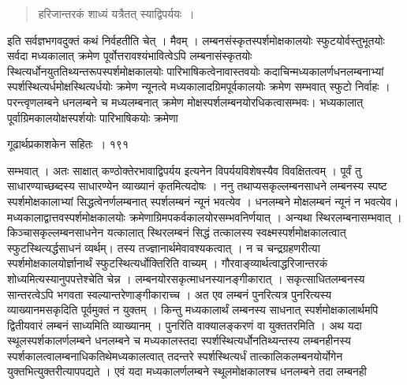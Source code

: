 \documentclass[11pt, openany]{book}
\begin{document}
\begin{quote}
{\qt हरिजान्तरकं शाध्यं यत्रैतत् स्याद्विपर्ययः~।}
\end{quote}

\begin{sloppypar}
इति सर्वज्ञभगवदुक्तं कथं निर्वहतीति चेत् । मैवम् । लम्बनसंस्कृतस्पर्शमोक्षकालयोः स्फुटयोर्वस्तुभूतयोः सर्वदा मध्यकालात् क्रमेण पूर्वोत्तरावश्यंभावित्वेऽपि लम्बनासंस्कृतयोः स्थित्यर्धोनयुततिथ्यन्तरूपस्पर्शमोक्षकालयोः पारिभाषिकत्वेनावास्तवयोः कदाचिन्मध्यकालर्णधनलम्बनाभ्यां स्पर्शस्थित्यर्धमोक्षस्थित्यर्धयोः क्रमेण न्यूनत्वे मध्यकालादग्रिमपूर्वकालयोः क्रमेण सम्भवात् स्फुटो निर्वाहः । परन्त्वृणलम्बने धनलम्बने च मध्यलम्बनात् क्रमेण मोक्षस्पर्शलम्बनयोरधिकत्वासम्भवः। भध्यकालात् पूर्वाग्रिमकालयोक्षस्पर्शयोः पारिभाषिकयोः क्रमेणा\textendash
\end{sloppypar}

\newpage

\hspace{3cm} गूढार्थप्रकाशकेन सहितः~। \hfill १९१
\vspace{1cm}

\begin{sloppypar}
\noindent सम्भवात् । अतः साक्षात् कण्ठोक्तेरभावाद्विपर्यय इत्यनेन विपर्ययविशेषस्यैव विवक्षितत्वम् । पूर्वं तु साधारण्याच्छब्दस्य साधारण्येन व्याख्यानं कृतमित्यदोषः । ननु तथाप्यसकृल्लम्बनसाधने लम्बनस्य स्पष्ट स्पर्शमोक्षकालाभ्यां सिद्धत्वेनर्णलम्बनात् स्पर्शलम्बनं न्यूनं भवत्येव । धनलम्बने मोक्षलम्बनं न्यूनं न भवत्येव। मध्यकालाद्वात्तवस्पर्शमोक्षकालयोः क्रमेणाग्रिमपकर्वकालयोरसम्भवनिर्णयात् । अन्यथा स्थिरलम्बनासम्भवात् । किञ्चासकृल्लम्बनसाधनेन यत्कालात् स्थिरलम्बनं सिद्धं तत्कालस्य स्वक्ष्मस्पर्शमोक्षकालत्वात् स्फुटस्थित्यर्द्धसाधनं व्यर्थम्। तस्य तज्ज्ञानार्थमेवावश्यकत्वात् । न च चन्द्रग्रहणरीत्या स्पर्शमोक्षकालयोर्ज्ञानार्थं स्फुटस्थित्यर्धोक्तिरिति वाच्यम् । गौरवाङ्व्यार्थत्वाद्धरिजान्तरकं शोध्यमित्यस्यानुपपत्तेश्चेति चेन्न । लम्बनयोरसकृत्माधनस्यानङ्गीकारात् । सकृत्साधितलम्बनस्य सान्तरत्वेऽपि भगवता स्वल्यान्तरेणाङ्गीकाराच्च । अत एव लम्बनं पुनरित्यत्र पुनरित्यस्य व्याख्यानमसकृदिति पूर्वमुक्तं न युक्तम् । किन्तु मध्यकालार्थं लम्बनस्य साधनात् स्पर्शमोक्षकालार्थमपि द्वितीयवारं लम्बनं साध्यमिति व्याख्यानम् । पुनरिति वाक्यालङ्करणं वा युक्ततरमिति । अथ यदा स्थूलस्पर्शकालर्णलम्बने धनलम्बने च मध्यकालस्तदा स्पर्शस्थित्यर्धोनतिथ्यन्तस्य लम्बनहीनस्य स्पर्शकालत्वालम्बनाधिकतिथेमध्यकालत्वात् तदन्तरे स्पर्शस्थित्यर्धं तात्कालिकलम्बनयोर्योगेन युक्तभित्युक्तरीत्यापपद्यते । एवं यदा मध्यकालर्णलम्बने स्थूलमोक्षकालश्च धनलम्बने तदा लम्बनही\textendash
\end{sloppypar}
\end{document}
